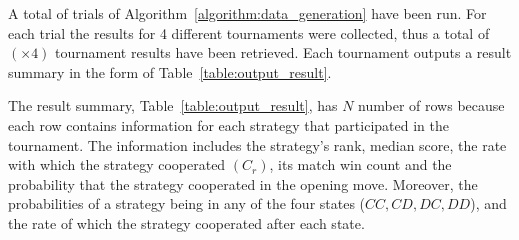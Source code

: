 \documentclass{article}
\newcommand{\uniquenumberofseeds}{}
\newcommand{\numberofalltournaments}{}
\begin{document}
A total of \uniquenumberofseeds trials of Algorithm~\ref{algorithm:data_generation} have been
run. For each trial the results for 4 different tournaments were collected,
thus a total of \numberofalltournaments $(\uniquenumberofseeds \times 4)$ tournament results have been
retrieved. Each tournament outputs a result summary in the form of
Table~\ref{table:output_result}.

The result summary, Table~\ref{table:output_result}, has \(N\) number of rows
because each row contains information for each strategy that participated in the
tournament. The information includes the strategy's rank, median score, the rate
with which the strategy cooperated $(C_r)$, its match win count and the probability that
the strategy cooperated in the opening move. Moreover, the probabilities of a strategy
being in any of the four states ($CC, CD, DC, DD$), and the rate of which the
strategy cooperated after each state.

\begin{table}[h!]
    \begin{center}
\end{center}
\caption{Output result of a single tournament.}\label{table:output_result}
\end{table}
\end{document}
